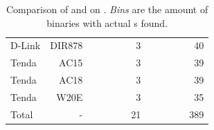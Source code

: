 \begin{table}[tb]
{\begin{tabular}{lr:rrrrr:rrrrr}
		D-Link                 & DIR878             &
		\satcManFourthAlerts   & \satcManFourthTP   & \satcManFourthTime                  & \satcManFourthBins                      & 3             &
		\mangoManFourthAlerts  & \mangoManFourthTP  & \mangoManFourthTime                 & \mangoManFourthBins                     & 40                                                                                                                                                         \\

		Tenda                  & AC15               &
		\satcManFifthAlerts    & \satcManFifthTP    & \satcManFifthTime                   & \satcManFifthBins                       & 3             &
		\mangoManFifthAlerts   & \mangoManFifthTP   & \mangoManFifthTime                  & \mangoManFifthBins                      & 39                                                                                                                                                         \\

		Tenda                  & AC18               &
		\satcManSixthAlerts    & \satcManSixthTP    & \satcManSixthTime                   & \satcManSixthBins                       & 3             &
		\mangoManSixthAlerts   & \mangoManSixthTP   & \mangoManSixthTime                  & \mangoManSixthBins                      & 39                                                                                                                                                         \\

		Tenda                  & W20E               &
		\satcManSeventhAlerts  & \satcManSeventhTP  & \satcManSeventhTime                 & \satcManSeventhBins                     & 3             &
		\mangoManSeventhAlerts & \mangoManSeventhTP & \mangoManSeventhTime                & \mangoManSeventhBins                    & 35                                                                                                                                                         \\
		\hline
		Total                  & -                  &
		\satcManTotalAlerts    & \satcManTotalTP    & \satcManTotalTime                   & \satcManTotalBins                       & 21            &
		\mangoManTotalAlerts   & \mangoManTotalTP   & \mangoManTotalTime                  & \mangoManTotalBins                      & 389                                                                                                                                                        \\
		\hline
	\end{tabular}
	}
	\caption{Comparison of \satc and \toolname on \satcHandPickDataset. \textit{\trupoc Bins} are the amount of binaries with actual \trupoc{}s found.\\
	}
	\label{tab:mango_satc_manual}
\end{table}
